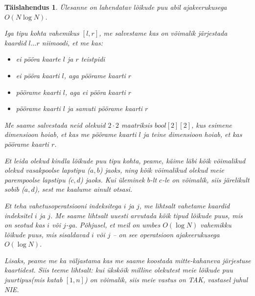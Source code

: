 \documentclass{trkut}
\newtheorem*{solution}{Täislahendus}
\begin{document}
\begin{solution}
Ülesanne on lahendatav lõikude puu abil ajakeerukusega $O(N\log N)$.

Iga tipu kohta vahemikus $[l, r]$, me salvestame kas on võimalik järjestada kaardid $l...r$ niimoodi, et me kas:
\begin{itemize}
    \item ei pööra kaarte $l$ ja $r$ teistpidi
    \item ei pööra kaarti $l$, aga pöörame kaarti $r$
    \item pöörame kaarti $l$, aga ei pööra kaarti $r$
    \item pöörame kaarti $l$ ja samuti pöörame kaarti $r$
\end{itemize}

Me saame salvestada neid olekuid $2\cdot2$ maatriksis $bool[2][2]$, kus esimene dimensioon hoiab, et kas me pöörame kaarti $l$ ja teine dimensioon hoiab, et kas pöörame kaarti $r$.

Et leida olekud kindla lõikude puu tipu kohta, peame, käime läbi kõik võimalikud olekud vasakpoolse lapstipu ($a, b$) jaoks, ning kõik võimalikud olekud meie parempoolse lapstipu ($c, d$) jaoks. Kui üleminek $b$-lt $c$-le on võimalik, siis järelikult sobib ($a, d$), sest me kaalume ainult otsasi.

Et teha vahetusoperatsiooni indeksitega $i$ ja $j$, me lihtsalt vahetame kaardid indeksitel $i$ ja $j$.
Me saame lihtsalt uuesti arvutada kõik tipud lõikude puus, mis on seotud kas $i$ või $j$-ga. 
Põhjusel, et meil on umbes $O(\log N)$ vahemikku lõikude puus, mis sisaldavad $i$ või $j$ -- on see operatsioon ajakeerukusega $O(\log N)$.

Lisaks, peame me ka väljastama kas me saame koostada mitte-kahaneva järjestuse kaartidest.
Siis teeme lihtsalt:
kui ükskõik milline olekutest meie lõikude puu juurtipus(mis katab $[1, n]$) on võimalik, siis meie vastus on TAK, vastasel juhul NIE.
\end{solution}
\end{document}
